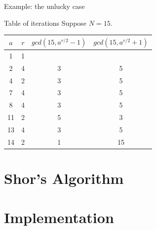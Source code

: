 \documentclass{beamer}
\begin{document}
    \begin{frame}{Example: the unlucky case}
        \begin{exampleblock}{Table of iterations}
            Suppose $N = 15$.
            \begin{center}
                \begin{tabular}{ |c|c|c|c| } 
                    \hline
                    $a$ & $r$ & $gcd(15, a^{r/2} - 1)$ & $gcd(15, a^{r/2} + 1)$ \\ 
                    \hline
                    1 & 1 & & \\ 
                    \hline
                    2 & 4 & 3 & 5 \\ 
                    \hline
                    4 & 2 & 3 & 5 \\
                    \hline
                    7 & 4 & 3 & 5 \\
                    \hline
                    8 & 4 & 3 & 5 \\
                    \hline
                    11 & 2 & 5 & 3 \\
                    \hline
                    13 & 4 & 3 & 5 \\
                    \hline
                    \rowcolor{orangered} 14 & 2 & 1 & 15 \\
                    \hline
                \end{tabular}
            \end{center}
        \end{exampleblock}
    \end{frame}

    \section{Shor's Algorithm}
    \begin{frame}{}
    \end{frame}

    \section{Implementation}
    
    
\end{document}
